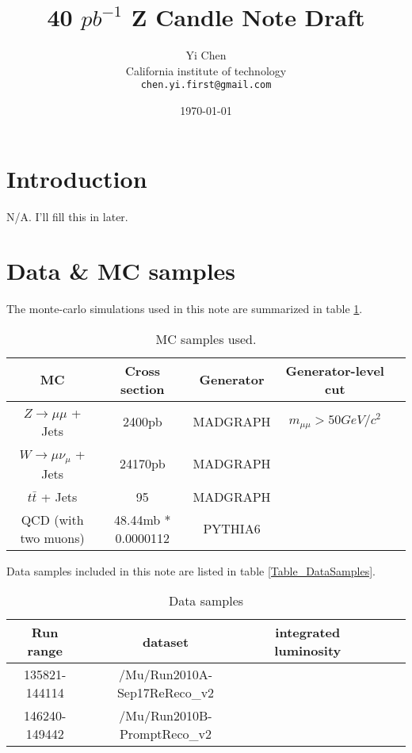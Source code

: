 \documentclass[10pt,a4paper,onecolumn]{article}
\begin{document}
\author{Yi Chen\\
   California institute of technology\\
   \texttt{chen.yi.first@gmail.com}}
\title{40 $pb^{-1}$ Z Candle Note Draft}
\date{\today}
\maketitle

\tableofcontents
\clearpage 

\section{Introduction}

N/A.  I'll fill this in later.

\section{Data \& MC samples}

The monte-carlo simulations used in this note are summarized in table \ref{Table_MCSamples}.

\begin{table}[h]
   \caption{MC samples used.}
   \centering
   \begin{tabular}{|c|c|c|c|c|}
   \hline
   MC & Cross section & Generator & Generator-level cut \\\hline
   $Z\rightarrow\mu\mu$ + Jets & 2400pb & MADGRAPH & $m_{\mu\mu} > 50 GeV/c^2$ \\\hline
   $W\rightarrow\mu\nu_\mu$ + Jets & 24170pb & MADGRAPH &  \\\hline
   $t\bar{t}$ + Jets & 95 & MADGRAPH &  \\\hline
   QCD (with two muons) & 48.44mb * 0.0000112 & PYTHIA6 &  \\\hline
   \end{tabular}
   \label{Table_MCSamples}
\end{table}

Data samples included in this note are listed in table \ref{Table_DataSamples}.

\begin{table}[h]
   \caption{Data samples}
   \centering
   \begin{tabular}{|c|c|c|c|c|c|}
   \hline
   Run range & dataset & integrated luminosity \\\hline
   135821-144114 & /Mu/Run2010A-Sep17ReReco\_v2 &  \\\hline
   146240-149442 & /Mu/Run2010B-PromptReco\_v2 &  \\\hline
   \end{tabular}
\end{table}
\end{document}
